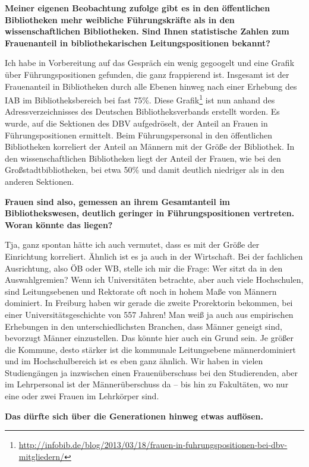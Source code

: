 \documentclass[a4paper,
fontsize=11pt,
oneside,
numbers=noperiodatend,
parskip=half-,
bibliography=totoc,
final
]{scrartcl}
\begin{document}
\textbf{Meiner eigenen Beobachtung zufolge gibt es in den öffentlichen
Bibliotheken mehr weibliche Führungs\-kräfte als in den wissenschaftlichen
Bibliotheken. Sind Ihnen statistische Zahlen zum Frauenanteil in
bibliothekarischen Leitungspositionen bekannt?}

Ich habe in Vorbereitung auf das Gespräch ein wenig gegoogelt und eine
Grafik über Führungs\-positionen gefunden, die ganz frappierend ist.
Insgesamt ist der Frauenanteil in Bibliotheken durch alle Ebenen hinweg
nach einer Erhebung des IAB im Bibliotheksbereich bei fast 75\%. Diese
Grafik\footnote{\url{http://infobib.de/blog/2013/03/18/frauen-in-fuhrungspositionen-bei-dbv-mitgliedern/}}
ist nun anhand des Adressverzeichnisses des Deutschen
Bibliotheksverbands erstellt worden. Es wurde, auf die Sektionen des DBV
aufgedröselt, der Anteil an Frauen in Führungs\-positionen ermittelt. Beim
Führungspersonal in den öffentlichen Bibliotheken korreliert der Anteil
an Männern mit der Größe der Bibliothek. In den wissenschaftlichen
Bibliotheken liegt der Anteil der Frauen, wie bei den
Großstadtbibliotheken, bei etwa 50\% und damit deutlich niedriger als in
den anderen Sektionen.

\textbf{Frauen sind also, gemessen an ihrem Gesamtanteil im
Bibliothekswesen, deutlich geringer in Führungspositionen vertreten.
Woran könnte das liegen?}

Tja, ganz spontan hätte ich auch vermutet, dass es mit der Größe der
Einrichtung korreliert. Ähnlich ist es ja auch in der Wirtschaft. Bei
der fachlichen Ausrichtung, also ÖB oder WB, stelle ich mir die Frage:
Wer sitzt da in den Auswahlgremien? Wenn ich Universitäten betrachte,
aber auch viele Hochschulen, sind Leitungsebenen und Rektorate oft noch
in hohem Maße von Männern dominiert. In Freiburg haben wir gerade die
zweite Prorektorin bekommen, bei einer Universitätsgeschichte von 557
Jahren! Man weiß ja auch aus empirischen Erhebungen in den
unterschiedlichsten Branchen, dass Männer geneigt sind, bevorzugt Männer
einzustellen. Das könnte hier auch ein Grund sein. Je größer die
Kommune, desto stärker ist die kommunale Leitungsebene männerdominiert
und im Hochschulbereich ist es eben ganz ähnlich. Wir haben in vielen
Studiengängen ja inzwischen einen Frauenüberschuss bei den Studierenden,
aber im Lehrpersonal ist der Männerüberschuss da -- bis hin zu
Fakultäten, wo nur eine oder zwei Frauen im Lehrkörper sind.

\textbf{Das dürfte sich über die Generationen hinweg etwas auflösen.}
\end{document}
